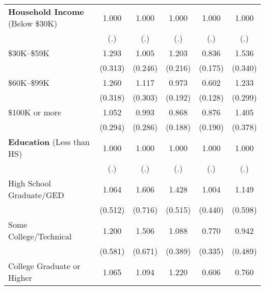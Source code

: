 \begin{table}[htbp]
\begin{tabular}{l*{5}{c}}
\textbf{Household Income} (Below \$30K)&       1.000         &       1.000         &       1.000         &       1.000         &       1.000         \\
                    &         (.)         &         (.)         &         (.)         &         (.)         &         (.)         \\
\$30K--\$59K        &       1.293         &       1.005         &       1.203         &       0.836         &       1.536\sym{*}  \\
                    &     (0.313)         &     (0.246)         &     (0.216)         &     (0.175)         &     (0.340)         \\
\$60K--\$99K        &       1.260         &       1.117         &       0.973         &       0.602\sym{**} &       1.233         \\
                    &     (0.318)         &     (0.303)         &     (0.192)         &     (0.128)         &     (0.299)         \\
\$100K or more      &       1.052         &       0.993         &       0.868         &       0.876         &       1.405         \\
                    &     (0.294)         &     (0.286)         &     (0.188)         &     (0.190)         &     (0.378)         \\
\textbf{Education} (Less than HS)&       1.000         &       1.000         &       1.000         &       1.000         &       1.000         \\
                    &         (.)         &         (.)         &         (.)         &         (.)         &         (.)         \\
High School Graduate/GED&       1.064         &       1.606         &       1.428         &       1.004         &       1.149         \\
                    &     (0.512)         &     (0.716)         &     (0.515)         &     (0.440)         &     (0.598)         \\
Some College/Technical&       1.200         &       1.506         &       1.088         &       0.770         &       0.942         \\
                    &     (0.581)         &     (0.671)         &     (0.389)         &     (0.335)         &     (0.489)         \\
College Graduate or Higher&       1.065         &       1.094         &       1.220         &       0.606         &       0.760         \\

\end{tabular}
\end{table}
